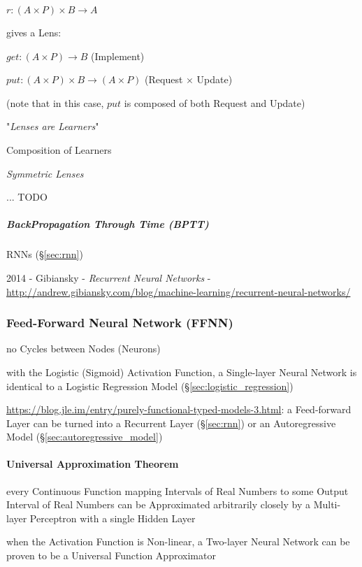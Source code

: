 $r : (A \times P) \times B \to A$

gives a Lens:

$get : (A \times P) \to B$ (Implement)

$put : (A \times P) \times B \to (A \times P)$ (Request $\times$ Update)

(note that in this case, $put$ is composed of both Request and Update)

"\emph{Lenses are Learners}"

Composition of Learners

\emph{Symmetric Lenses}

... TODO



\subparagraph{BackPropagation Through Time (BPTT)}\label{sec:bptt}\hfill

RNNs (\S\ref{sec:rnn})

2014 - Gibiansky - \emph{Recurrent Neural Networks} -
\url{http://andrew.gibiansky.com/blog/machine-learning/recurrent-neural-networks/}



\subsubsection{Feed-Forward Neural Network (FFNN)}\label{sec:ffnn}

no Cycles between Nodes (Neurons)

with the Logistic (Sigmoid) Activation Function, a Single-layer Neural Network
is identical to a Logistic Regression Model (\S\ref{sec:logistic_regression})

\url{https://blog.jle.im/entry/purely-functional-typed-models-3.html}: a
Feed-forward Layer can be turned into a Recurrent Layer (\S\ref{sec:rnn}) or an
Autoregressive Model (\S\ref{sec:autoregressive_model})



\paragraph{Universal Approximation Theorem}
\label{sec:universal_approximation}\hfill

every Continuous Function mapping Intervals of Real Numbers to some Output
Interval of Real Numbers can be Approximated arbitrarily closely by a
Multi-layer Perceptron with a single Hidden Layer

when the Activation Function is Non-linear, a Two-layer Neural Network can be
proven to be a Universal Function Approximator



